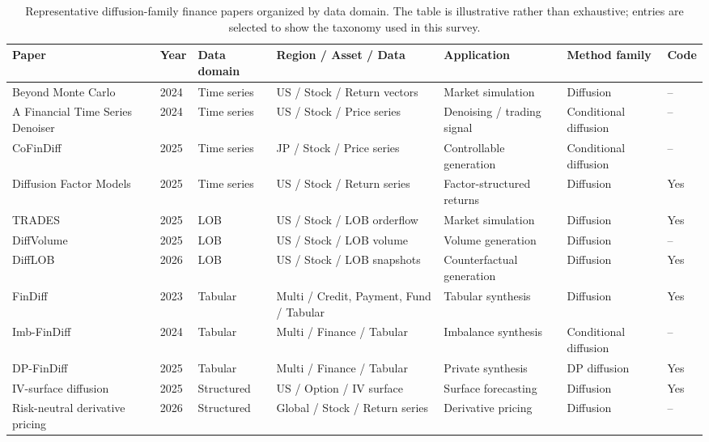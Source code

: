 \documentclass[sigconf,nonacm]{acmart}
\begin{document}
\begin{table}[t]
\centering
\caption{Representative diffusion-family finance papers organized by data
domain. The table is illustrative rather than exhaustive; entries are selected
to show the taxonomy used in this survey.}
\label{tab:representative}
\scriptsize
\setlength{\tabcolsep}{2pt}
\begin{tabular}{@{}p{}p{}p{}p{}p{}p{}p{}@{}}
\toprule
Paper & Year & Data domain & Region / Asset / Data & Application & Method family & Code \\
\midrule
Beyond Monte Carlo~\cite{lesniewski2024beyondmc} & 2024 & Time series & US / Stock / Return vectors & Market simulation & Diffusion & -- \\
A Financial Time Series Denoiser~\cite{wang2024ftsdenoiser} & 2024 & Time series & US / Stock / Price series & Denoising / trading signal & Conditional diffusion & -- \\
CoFinDiff~\cite{tanaka2025cofindiff} & 2025 & Time series & JP / Stock / Price series & Controllable generation & Conditional diffusion & -- \\
Diffusion Factor Models~\cite{chen2025difffactor} & 2025 & Time series & US / Stock / Return series & Factor-structured returns & Diffusion & Yes \\
TRADES~\cite{berti2025trades} & 2025 & LOB & US / Stock / LOB orderflow & Market simulation & Diffusion & Yes \\
DiffVolume~\cite{wang2025diffvolume} & 2025 & LOB & US / Stock / LOB volume & Volume generation & Diffusion & -- \\
DiffLOB~\cite{wang2026difflob} & 2026 & LOB & US / Stock / LOB snapshots & Counterfactual generation & Diffusion & Yes \\
FinDiff~\cite{sattarov2023findiff} & 2023 & Tabular & Multi / Credit, Payment, Fund / Tabular & Tabular synthesis & Diffusion & Yes \\
Imb-FinDiff~\cite{sattarov2024imbfindiff} & 2024 & Tabular & Multi / Finance / Tabular & Imbalance synthesis & Conditional diffusion & -- \\
DP-FinDiff~\cite{sattarov2025dpfindiff} & 2025 & Tabular & Multi / Finance / Tabular & Private synthesis & DP diffusion & Yes \\
IV-surface diffusion~\cite{jin2025ivsurface} & 2025 & Structured & US / Option / IV surface & Surface forecasting & Diffusion & Yes \\
Risk-neutral derivative pricing~\cite{tiwari2026riskneutral} & 2026 & Structured & Global / Stock / Return series & Derivative pricing & Diffusion & -- \\
\bottomrule
\end{tabular}
\end{table}
\end{document}
